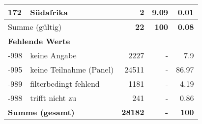 \begin{longtable}{lXrrr}
     172 &
     \multicolumn{1}{X}{ Südafrika   } &


       \num{2} &
       \num[round-mode=places,round-precision=2]{9.09} &
         \num[round-mode=places,round-precision=2]{0.01} \\
     \midrule
     \multicolumn{2}{l}{Summe (gültig)} &
       \textbf{\num{22}} &
     \textbf{100} &
       \textbf{\num[round-mode=places,round-precision=2]{0.08}} \\
     \multicolumn{5}{l}{\textbf{Fehlende Werte}}\\
       -998 &
       keine Angabe &
         \num{2227} &
        - &
         \num[round-mode=places,round-precision=2]{7.9} \\
       -995 &
       keine Teilnahme (Panel) &
         \num{24511} &
        - &
         \num[round-mode=places,round-precision=2]{86.97} \\
       -989 &
       filterbedingt fehlend &
         \num{1181} &
        - &
         \num[round-mode=places,round-precision=2]{4.19} \\
       -988 &
       trifft nicht zu &
         \num{241} &
        - &
         \num[round-mode=places,round-precision=2]{0.86} \\
     \midrule
     \multicolumn{2}{l}{\textbf{Summe (gesamt)}} &
          \textbf{\num{28182}} &
        \textbf{-} &
        \textbf{100} \\
     \bottomrule
     \end{longtable}
     
